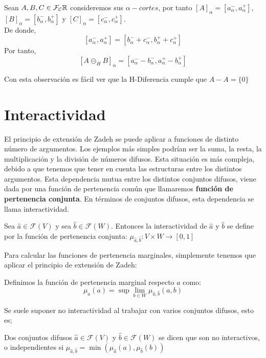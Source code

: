 \begin{observacion}
	Sean $A, B, C \in \mathcal{F}_\mathcal{C}\mathbb R$ consideremos sus $\alpha - cortes$, por tanto $[A]_\alpha = [a^-_\alpha, a^+_\alpha]$, $[B]_\alpha = [b^-_\alpha, b^+_\alpha]$ y $[C]_\alpha = [c^-_\alpha, c^+_\alpha]$. \\
	De donde,
	$$
	[a^-_\alpha, a^+_\alpha] = [b^-_\alpha + c^-_\alpha, b^+_\alpha + c^+_\alpha]
	$$
	Por tanto, 
	$$
	[A \circleddash_H B]_\alpha = [a_\alpha^- - b_\alpha^-, a_\alpha^+ - b_\alpha^+]
	$$
\end{observacion}
Con esta observación es fácil ver que la H-Diferencia cumple que $A-A=\{0\}$


\section{Interactividad}
El principio de extensión de Zadeh se puede aplicar a funciones de distinto número de argumentos. Los ejemplos más simples podrían ser la suma, la resta, la multiplicación y la división de números difusos. Esta situación es más compleja, debido a que tenemos que tener en cuenta las estructuras entre los distintos argumentos. Esta dependencia mutua entre los distintos conjuntos difusos, viene dada por una función de pertenencia común que llamaremos \textbf{función de pertenencia conjunta}. En términos de conjuntos difusos, esta dependencia se llama interactividad.

\begin{definicion}
	Sea $\hat{a} \in \mathcal{F}(V)$ y sea $\hat{b} \in \mathcal{F}(W)$. Entonces la interactividad de $\hat{a}$ y $\hat{b}$ se define por la función de pertenencia conjunta: $\mu_{\hat{a}, \hat{b}} : V \times W \rightarrow [0, 1]$
\end{definicion}
Para calcular las funciones de pertenencia marginales, simplemente tenemos que aplicar el principio de extensión de Zadeh:

\begin{definicion}
	Definimos la función de pertenencia marginal respecto $a$ como:
	\[
	\mu_a(a) = \sup\lim\limits_{b \in W} \mu_{\hat{a}, \hat{b}} (a, b)
	\]
\end{definicion}

Se suele suponer no interactividad al trabajar con varios conjuntos difusos, esto es;

\begin{definicion}
	Dos conjuntos difusos $\hat{a} \in \mathcal{F}(V)$ y $\hat{b} \in \mathcal{F}(W)$ se dicen que son no interactivos, o independientes si $\mu_{\hat{a}, \hat{b}} = \min(\mu_{\hat{a}}(a), \mu_{\hat{b}}(b))$
\end{definicion}

